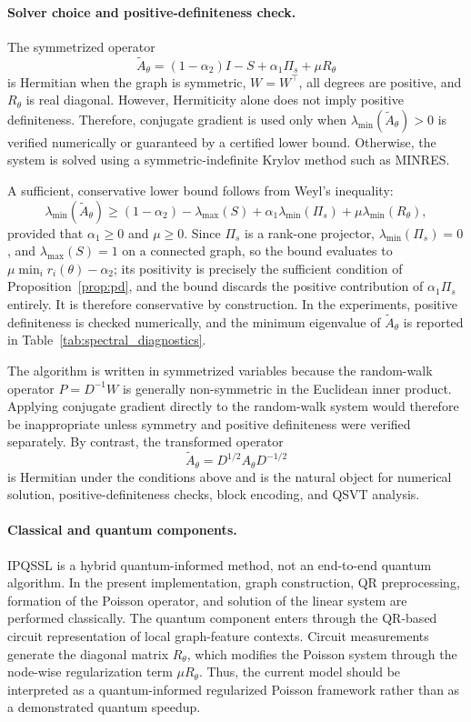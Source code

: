 \documentclass[11pt,a4paper]{article}
\begin{document}
\paragraph{Solver choice and positive-definiteness check.}
The symmetrized operator
\[
\widetilde A_\theta
=
(1-\alpha_2)I
-
S
+
\alpha_1\Pi_s
+
\mu R_\theta
\]
is Hermitian when the graph is symmetric, \(W=W^\top\), all degrees are
positive, and \(R_\theta\) is real diagonal. However, Hermiticity alone does
not imply positive definiteness. Therefore, conjugate gradient is used only
when \(\lambda_{\min}(\widetilde A_\theta)>0\) is verified numerically or
guaranteed by a certified lower bound. Otherwise, the system is solved using
a symmetric-indefinite Krylov method such as MINRES.

A sufficient, conservative lower bound follows from Weyl's inequality:
\[
\lambda_{\min}(\widetilde A_\theta)
\geq
(1-\alpha_2)
-
\lambda_{\max}(S)
+
\alpha_1\lambda_{\min}(\Pi_s)
+
\mu\lambda_{\min}(R_\theta),
\]
provided that \(\alpha_1\geq 0\) and \(\mu\geq 0\).
Since \(\Pi_s\) is a rank-one projector, \(\lambda_{\min}(\Pi_s)=0\), and
\(\lambda_{\max}(S)=1\) on a connected graph, so the bound evaluates to
\(\mu\min_i r_i(\theta)-\alpha_2\); its positivity is precisely the
sufficient condition of Proposition~\ref{prop:pd}, and the bound discards
the positive contribution of \(\alpha_1\Pi_s\) entirely. It is therefore
conservative by construction. In the experiments, positive definiteness is
checked numerically, and the minimum eigenvalue of
\(\widetilde A_\theta\) is reported in
Table~\ref{tab:spectral_diagnostics}.

The algorithm is written in symmetrized variables because the random-walk
operator \(P=D^{-1}W\) is generally non-symmetric in the Euclidean inner
product. Applying conjugate gradient directly to the random-walk system would
therefore be inappropriate unless symmetry and positive definiteness were
verified separately. By contrast, the transformed operator
\[
\widetilde A_\theta
=
D^{1/2}A_\theta D^{-1/2}
\]
is Hermitian under the conditions above and is the natural object for
numerical solution, positive-definiteness checks, block encoding, and QSVT
analysis.

\paragraph{Classical and quantum components.}
IPQSSL is a hybrid quantum-informed method, not an end-to-end quantum
algorithm. In the present implementation, graph construction, QR
preprocessing, formation of the Poisson operator, and solution of the linear
system are performed classically. The quantum component enters through the
QR-based circuit representation of local graph-feature contexts. Circuit
measurements generate the diagonal matrix \(R_\theta\), which modifies the
Poisson system through the node-wise regularization term \(\mu R_\theta\).
Thus, the current model should be interpreted as a quantum-informed
regularized Poisson framework rather than as a demonstrated quantum speedup.
\end{document}
